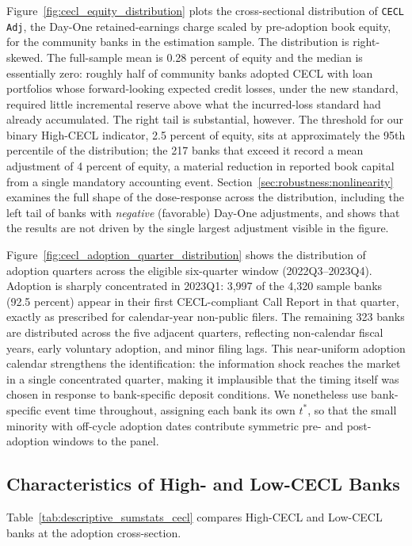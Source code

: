 Figure~\ref{fig:cecl_equity_distribution} plots the cross-sectional distribution
of \texttt{CECL Adj}, the Day-One retained-earnings charge scaled by pre-adoption
book equity, for the community banks in the estimation sample.  The
distribution is right-skewed.  The full-sample mean is 0.28 percent of equity and
the median is essentially zero: roughly half of community banks adopted CECL with
loan portfolios whose forward-looking expected credit losses, under the new
standard, required little incremental reserve above what the incurred-loss
standard had already accumulated.  The right tail is substantial, however.
The threshold for our binary High-CECL indicator, 2.5 percent of equity, sits
at approximately the 95th percentile of the distribution; the 217 banks that
exceed it record a mean adjustment of 4 percent of equity, a material
reduction in reported book capital from a single mandatory accounting event.
Section~\ref{sec:robustness:nonlinearity} examines the full shape of the
dose-response across the distribution, including the left tail of banks with
\emph{negative} (favorable) Day-One adjustments, and shows that the results
are not driven by the single largest adjustment visible in the figure.

Figure~\ref{fig:cecl_adoption_quarter_distribution} shows the distribution of
adoption quarters across the eligible six-quarter window (2022Q3--2023Q4).
Adoption is sharply concentrated in 2023Q1: 3,997 of the 4,320 sample banks
(92.5 percent) appear in their first CECL-compliant Call Report in that quarter,
exactly as prescribed for calendar-year non-public filers.  The remaining
323 banks are distributed across the five adjacent quarters, reflecting
non-calendar fiscal years, early voluntary adoption, and minor filing lags.
This near-uniform adoption calendar strengthens the identification: the
information shock reaches the market in a single concentrated quarter, making
it implausible that the timing itself was chosen in response to bank-specific
deposit conditions.  We nonetheless use bank-specific event time throughout,
assigning each bank its own $t^{*}$, so that the small minority with off-cycle
adoption dates contribute symmetric pre- and post-adoption windows to the panel.

\subsection{Characteristics of High- and Low-CECL Banks}
\label{sec:descriptive:balance}

Table~\ref{tab:descriptive_sumstats_cecl} compares High-CECL and Low-CECL banks
at the adoption cross-section.

